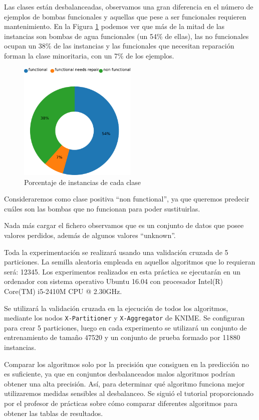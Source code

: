 \documentclass[a4paper, 20pt]{article}
\begin{document}
Las clases están desbalanceadas, observamos una gran diferencia en el número de ejemplos de bombas funcionales y aquellas que pese a ser funcionales requieren mantenimiento. En la Figura \ref{fig:clases2} podemos ver que más de la mitad de las instancias son bombas de agua funcionales (un 54\% de ellas), las no funcionales ocupan un 38\% de las instancias y las funcionales que necesitan reparación forman la clase minoritaria, con un 7\% de los ejemplos.

\begin{figure}[H]
    \centering
    \includegraphics[width=0.5\textwidth]{chart2}
    \caption{Porcentaje de instancias de cada clase}
    \label{fig:clases2}
\end{figure}

Consideraremos como clase positiva ``non functional'', ya que queremos predecir cuáles son las bombas que no funcionan para poder sustituirlas.

Nada más cargar el fichero observamos que es un conjunto de datos que posee valores perdidos, además de algunos valores ``unknown''. 

Toda la experimentación se realizará usando una validación cruzada de 5 particiones. La semilla aleatoria empleada en aquellos algoritmos que lo requieran será: 12345.
Los experimentos realizados en esta práctica se ejecutarán en un ordenador con sistema operativo Ubuntu 16.04 con procesador Intel(R) Core(TM) i5-2410M CPU @ 2.30GHz.

Se utilizará la validación cruzada en la ejecución de todos los algoritmos, mediante los nodos \texttt{X-Partitioner} y \texttt{X-Aggregator} de KNIME. Se configuran para crear 5 particiones, luego en cada experimento se utilizará un conjunto de entrenamiento de tamaño 47520 y un conjunto de prueba formado por 11880 instancias.

Comparar los algoritmos solo por la precisión que consiguen en la predicción no es suficiente, ya que en conjuntos desbalanceados malos algoritmos podrían obtener una alta precisión. Así, para determinar qué algoritmo funciona mejor utilizaremos medidas sensibles al desbalanceo. Se siguió el tutorial proporcionado por el profesor de prácticas sobre cómo comparar diferentes algoritmos para obtener las tablas de resultados.
\end{document}
